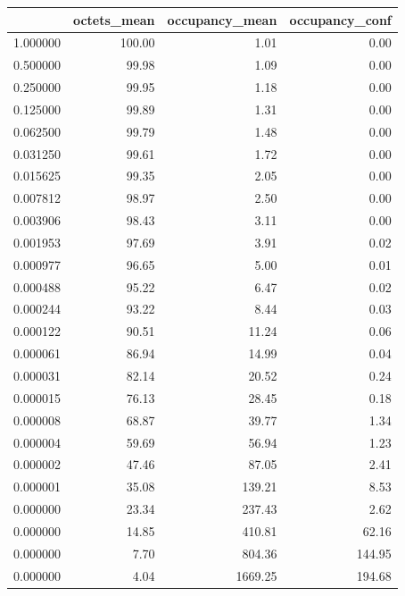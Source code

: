 \begin{tabular}{lrrr}
\toprule
 & octets_mean & occupancy_mean & occupancy_conf \\
\midrule
1.000000 & 100.00 & 1.01 & 0.00 \\
0.500000 & 99.98 & 1.09 & 0.00 \\
0.250000 & 99.95 & 1.18 & 0.00 \\
0.125000 & 99.89 & 1.31 & 0.00 \\
0.062500 & 99.79 & 1.48 & 0.00 \\
0.031250 & 99.61 & 1.72 & 0.00 \\
0.015625 & 99.35 & 2.05 & 0.00 \\
0.007812 & 98.97 & 2.50 & 0.00 \\
0.003906 & 98.43 & 3.11 & 0.00 \\
0.001953 & 97.69 & 3.91 & 0.02 \\
0.000977 & 96.65 & 5.00 & 0.01 \\
0.000488 & 95.22 & 6.47 & 0.02 \\
0.000244 & 93.22 & 8.44 & 0.03 \\
0.000122 & 90.51 & 11.24 & 0.06 \\
0.000061 & 86.94 & 14.99 & 0.04 \\
0.000031 & 82.14 & 20.52 & 0.24 \\
0.000015 & 76.13 & 28.45 & 0.18 \\
0.000008 & 68.87 & 39.77 & 1.34 \\
0.000004 & 59.69 & 56.94 & 1.23 \\
0.000002 & 47.46 & 87.05 & 2.41 \\
0.000001 & 35.08 & 139.21 & 8.53 \\
0.000000 & 23.34 & 237.43 & 2.62 \\
0.000000 & 14.85 & 410.81 & 62.16 \\
0.000000 & 7.70 & 804.36 & 144.95 \\
0.000000 & 4.04 & 1669.25 & 194.68 \\
\bottomrule
\end{tabular}
